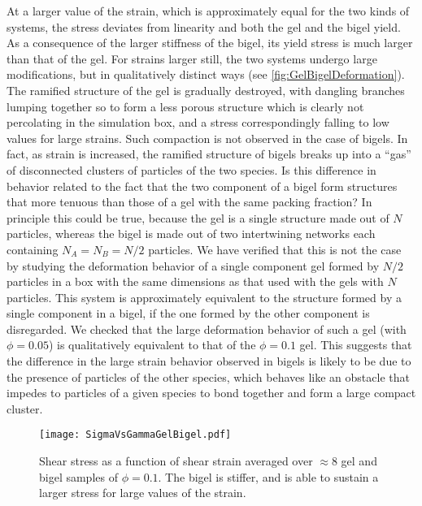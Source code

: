 At a larger value of the strain, which is approximately equal for the two kinds of systems, the stress deviates from linearity and both the gel and the bigel yield. As a consequence of the larger stiffness of the bigel, its yield stress is much larger than that of the gel. For strains larger still, the two systems undergo large modifications, but in qualitatively distinct ways (see \autoref{fig:GelBigelDeformation}). The ramified structure of the gel is gradually destroyed, with dangling branches lumping together so to form a less porous structure which is clearly not percolating in the simulation box, and a stress correspondingly falling to low values for large strains. Such compaction is not observed in the case of bigels. In fact, as strain is increased, the ramified structure of bigels breaks up into a ``gas'' of disconnected clusters of particles of the two species. Is this difference in behavior related to the fact that the two component of a bigel form structures that more tenuous than those of a gel with the same packing fraction? In principle this could be true, because the gel is a single structure made out of $N$ particles, whereas the bigel is made out of two intertwining networks each containing $N_{A} = N_{B} = N/2$ particles. We have verified that this is not the case by studying the deformation behavior of a single component gel formed by $N/2$ particles in a box with the same dimensions as that used with the gels with $N$ particles. This system is approximately equivalent to the structure formed by a single component in a bigel, if the one formed by the other component is disregarded. We checked that the large deformation behavior of such a gel (with $\phi = 0.05$) is qualitatively equivalent to that of the $\phi = 0.1$ gel.
This suggests that the difference in the large strain behavior observed in bigels is likely to be due to the presence of particles of the other species, which behaves like an obstacle that impedes to particles of a given species to bond together and form a large compact cluster.

\begin{figure}
	\centering
	\texttt{[image: SigmaVsGammaGelBigel.pdf]}
	\caption{Shear stress as a function of shear strain averaged over $\approx 8$ gel and bigel samples of $\phi = 0.1$. The bigel is stiffer, and is able to sustain a larger stress for large values of the strain.\label{fig:SigmaVsGammaGelBigel}}
\end{figure}

